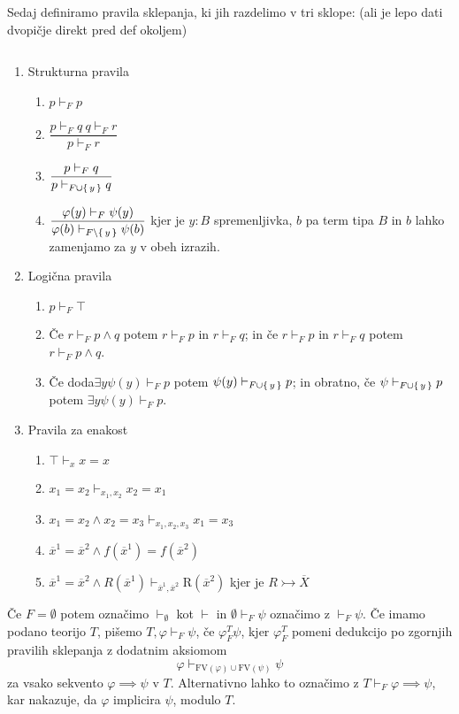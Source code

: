 \documentclass[../kategoricna_logika.tex]{subfiles}
\begin{document}
Sedaj definiramo pravila sklepanja, ki jih razdelimo v tri sklope: (ali je lepo dati dvopičje direkt pred def okoljem)
\begin{definicija}
  $ $
  \begin{enumerate}[label*=\arabic*.]
    \item Strukturna pravila
    \begin{enumerate}[label*=\arabic*.]
      \item $p \vdash_F p$
      \item $\dfrac{p \vdash_F q \ q \vdash_F r}{p \vdash_F r}$
      \item $\dfrac{p \vdash_F q}{p \vdash_{F \cup \left\lbrace\,y\,\right\rbrace} q}$
      \item $\dfrac{\varphi(y) \vdash_F \psi(y)}{\varphi(b) \vdash_{F\setminus\left\lbrace\,y\,\right\rbrace} \psi(b)}$
      kjer je $y : B$ spremenljivka, $b$ pa term tipa $B$ in $b$ lahko zamenjamo za $y$ v obeh izrazih.
    \end{enumerate}
    \item Logična pravila
    \begin{enumerate}[label*=\arabic*.]
      \item $p \vdash_F \top$
      \item Če $r \vdash_F p \wedge q$ potem $r \vdash_F p$ in $r \vdash_F q$; in če $r \vdash_F p$ in $r \vdash_F q$ potem $r \vdash_F p \wedge q$.
      \item Če doda$\exists y \psi(y) \vdash_F p$ potem $\psi(y) \vdash_{F \cup \left\lbrace\,y\,\right\rbrace} p$; in obratno, če $\psi \vdash_{F \cup \left\lbrace\,y\,\right\rbrace} p$ potem $\exists y \psi(y) \vdash_F p$.
    \end{enumerate}
    \item Pravila za enakost
    \begin{enumerate}[label*=\arabic*.]
      \item $\top \vdash_x x = x$
      \item $x_1 = x_2 \vdash_{x_1, x_2} x_2 = x_1$
      \item $x_1 = x_2 \wedge x_2 = x_3 \vdash_{x_1, x_2, x_3} x_1 = x_3$
      \item $\overline{x}^1 = \overline{x}^2 \wedge f(\overline{x}^1) = f(\overline{x}^2)$
      \item $\overline{x}^1 = \overline{x}^2 \wedge R(\overline{x}^1) \vdash_{\overline{x}^1, \overline{x}^2} \mathrm{R}(\overline{x}^2)$
      kjer je $R \rightarrowtail \overline{X}$
    \end{enumerate}
  \end{enumerate}
  Če $F = \emptyset$ potem označimo $\vdash_\emptyset$ kot $\vdash$ in $\emptyset \vdash_F \psi$ označimo z $\vdash_F \psi$.
  Če imamo podano teorijo $T$, pišemo $T, \varphi \vdash_F \psi$, če $\varphi_F^T \psi$, kjer $\varphi_F^T$ pomeni dedukcijo po zgornjih pravilih sklepanja z dodatnim aksiomom
  $$\varphi \vdash_{\mathrm{FV}(\varphi) \cup \mathrm{FV}(\psi)} \psi$$
  za vsako sekvento $\varphi \implies \psi$ v $T$. Alternativno lahko to označimo z $T \vdash_F \varphi \implies \psi$, kar nakazuje, da $\varphi$ implicira $\psi$, modulo $T$.
\end{definicija}
\begin{primer}[izpeljava]
  
\end{primer}
%
\end{document}
